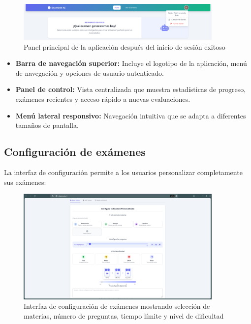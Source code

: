 \documentclass[12pt,a4paper]{report}
\begin{document}
\begin{figure}[h]
\centering
\includegraphics[width=0.9\textwidth]{assets/250617_06h44m55s_screenshot.png}
\caption{Panel principal de la aplicación después del inicio de sesión exitoso}
\label{fig:dashboard}
\end{figure}

\begin{itemize}
\item \textbf{Barra de navegación superior:} Incluye el logotipo de la aplicación, menú de navegación y opciones de usuario autenticado.
\item \textbf{Panel de control:} Vista centralizada que muestra estadísticas de progreso, exámenes recientes y acceso rápido a nuevas evaluaciones.
\item \textbf{Menú lateral responsivo:} Navegación intuitiva que se adapta a diferentes tamaños de pantalla.
\end{itemize}

\subsection{Configuración de exámenes}

La interfaz de configuración permite a los usuarios personalizar completamente sus exámenes:

\begin{figure}[h]
\centering
\includegraphics[width=0.9\textwidth]{assets/250617_06h45m25s_screenshot.png}
\caption{Interfaz de configuración de exámenes mostrando selección de materias, número de preguntas, tiempo límite y nivel de dificultad}
\label{fig:configuracion}
\end{figure}
\end{document}
